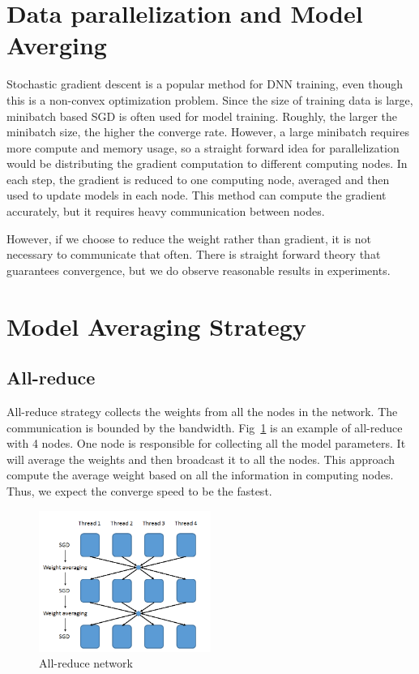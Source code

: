 \documentclass{article}
\begin{document}
\section{Data parallelization and Model Averging}
Stochastic gradient descent is a popular method for DNN training, even though this is a non-convex optimization 
problem. Since the size of training data is large, minibatch based SGD is often used for model training. 
Roughly, the larger the minibatch size, the higher the converge rate. However, a large minibatch requires
more compute and memory usage, so a straight forward idea for parallelization would be distributing the 
gradient computation to different computing nodes. In each step, the gradient is reduced to one computing node,
averaged and then used to update models in each node. This method can compute the gradient accurately, but 
it requires heavy communication between nodes.

However, if we choose to reduce the weight rather than gradient, it is not necessary to communicate that often. There
is straight forward theory that guarantees convergence, but we do observe reasonable results in experiments.


\section{Model Averaging Strategy}
\subsection{All-reduce}
All-reduce strategy collects the weights from all the nodes in the network. The communication is bounded by 
the bandwidth. Fig~\ref{fig:allreduce} is an example of all-reduce with 4 nodes. One node is responsible for
collecting all the model parameters. It will average the weights and then broadcast it to all the nodes. 
This approach compute the average weight based on all the information in computing nodes. Thus, we expect 
the converge speed to be the fastest.
\begin{figure}[htb]
  \centering
  \includegraphics[width=0.5\textwidth]{allreduce.png}
  \caption{All-reduce network}
  \label{fig:allreduce}
\end{figure}
\end{document}
